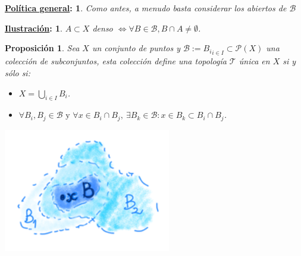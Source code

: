 \documentclass[10pt,a4paper,openright]{book}
\theoremstyle{break}
\newtheorem*{prop}{Proposición}
\newtheorem*{pg}{\underline{Política general}:}
\newtheorem*{il}{\underline{Ilustración}:}
\begin{document}
\begin{pg}
    Como antes, a menudo basta considerar los abiertos de $\mathcal{B}$ 
\end{pg}

\begin{il}
$A \subset X$ denso $\Leftrightarrow \forall B \in \mathcal{B}, B \cap A \neq \emptyset$.
\end{il}

\begin{prop}
Sea $X$ un conjunto de puntos y $\mathcal{B} := {B_i}_{i\in I} \subset \mathcal{P}\left( X \right)$ una colección de subconjuntos, esta colección define una topología $\mathcal{T}$ única en $X$ si y sólo si: 
\begin{itemize}
    \item $X = \bigcup_{i\in I} B_i$.
    \item $\forall B_i,B_j\in \mathcal{B} \mbox{ y } \forall x \in B_i \cap B_j, \ \exists B_k \in \mathcal{B} : x\in B_k\subset B_i \cap B_j$.
\end{itemize}
\begin{center}
    \includegraphics[scale=0.3]{images/base_unica} 
\end{center}
\end{prop}
\end{document}
